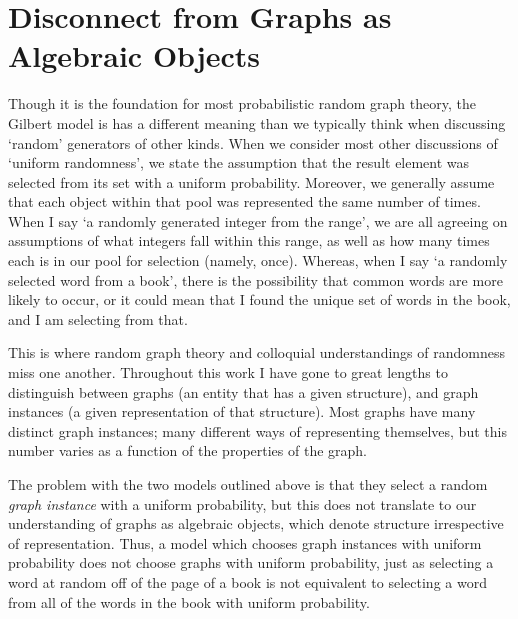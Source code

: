 \documentclass[11pt,a4paper]{report}
\begin{document}
\section{Disconnect from Graphs as Algebraic Objects}

Though it is the foundation for most probabilistic random graph theory, the Gilbert model is has a different meaning than we typically think when discussing `random' generators of other kinds.
When we consider most other discussions of `uniform randomness', we state the assumption that the result element was selected from its set with a uniform probability.
Moreover, we generally assume that each object within that pool was represented the same number of times.
When I say `a randomly generated integer from the range', we are all agreeing on assumptions of what integers fall within this range, as well as how many times each is in our pool for selection (namely, once). 
Whereas, when I say `a randomly selected word from a book', there is the possibility that common words are more likely to occur, or it could mean that I found the unique set of words in the book, and I am selecting from that.

This is where random graph theory and colloquial understandings of randomness miss one another.
Throughout this work I have gone to great lengths to distinguish between graphs (an entity that has a given structure), and graph instances (a given representation of that structure).
Most graphs have many distinct graph instances; many different ways of representing themselves, but this number varies as a function of the properties of the graph.

The problem with the two models outlined above is that they select a random \emph{graph instance} with a uniform probability, but this does not translate to our understanding of graphs as algebraic objects, which denote structure irrespective of representation.
Thus, a model which chooses graph instances with uniform probability does not choose graphs with uniform probability, just as selecting a word at random off of the page of a book is not equivalent to selecting a word from all of the words in the book with uniform probability.
\end{document}

